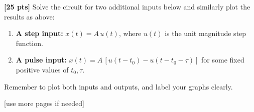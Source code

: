 \documentclass{ee102_pset}
\begin{document}
\problempart \textbf{[25 pts]}  
Solve the circuit for two additional inputs below and similarly plot the results as above:
\begin{enumerate}\itemsep2pt
  \item \textbf{A step input:} \(x(t)=A\,u(t)\), where $u(t)$ is the unit magnitude step function.
  \item \textbf{A pulse input:} \(x(t)=A\,[u(t-t_0)-u(t-t_0-\tau)]\) for some fixed positive values of \(t_0,\tau\).
\end{enumerate}
Remember to plot both inputs and outputs, and label your graphs clearly.
\vspace*{\fill}
\begin{center}
[use more pages if needed]
\end{center}
\end{document}
